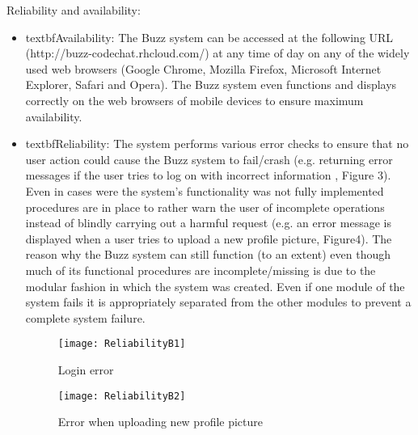\item Reliability and availability:

\begin{itemize}
	\item textbf{Availability: }
	The Buzz system can be accessed at the following URL (http://buzz-codechat.rhcloud.com/) at any time of day on any of the widely used web browsers (Google Chrome, Mozilla Firefox, Microsoft Internet Explorer, Safari and Opera). The Buzz system even functions and displays correctly on the web browsers of mobile devices to ensure maximum availability.
	\item textbf{Reliability: }
	The system performs various error checks to ensure that no user action could cause the Buzz system to fail/crash (e.g. returning error messages if the user tries to log on with incorrect information , Figure 3). Even in cases were the system’s functionality was not fully implemented procedures are in place to rather warn the user of incomplete operations instead of blindly carrying out a harmful request (e.g. an error message is displayed when a user tries to upload a new profile picture, Figure4). The reason why the Buzz system can still function (to an extent) even though much of its functional procedures are incomplete/missing is due to the modular fashion in which the system was created. Even if one module of the system fails it is appropriately separated from the other modules to prevent a complete system failure.

\begin{figure}[h!]
  \centering
    \texttt{[image: ReliabilityB1]}
    \caption{Login error}
\end{figure}

\begin{figure}[h!]
  \centering
    \texttt{[image: ReliabilityB2]}
    \caption{Error when uploading new profile picture}
\end{figure}

\end{itemize}
	
